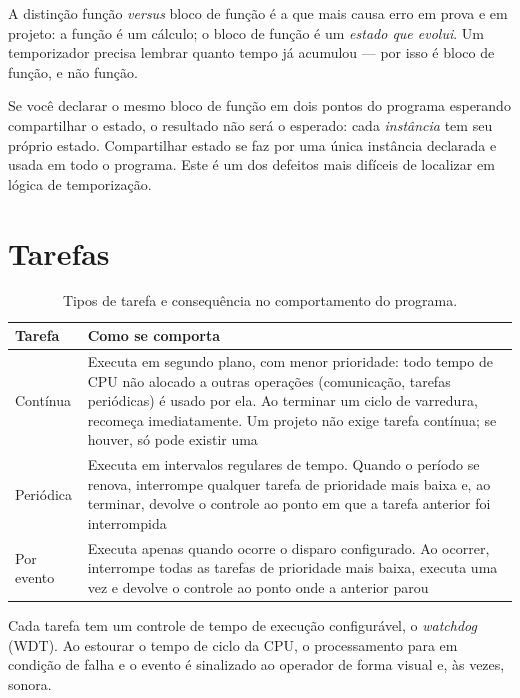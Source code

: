 A distinção função \emph{versus} bloco de função é a que mais causa erro em prova e em projeto: a
função é um cálculo; o bloco de função é um \emph{estado que evolui}. Um temporizador precisa
lembrar quanto tempo já acumulou --- por isso é bloco de função, e não função.

\begin{atencao}
Se você declarar o mesmo bloco de função em dois pontos do programa esperando compartilhar o estado,
o resultado não será o esperado: cada \emph{instância} tem seu próprio estado. Compartilhar estado se
faz por uma única instância declarada e usada em todo o programa. Este é um dos defeitos mais difíceis
de localizar em lógica de temporização.
\end{atencao}

\section{Tarefas}
\label{sec:tarefas}

\begin{table}[H]
  \centering
  \caption{Tipos de tarefa e consequência no comportamento do programa.}
  \label{tab:tipos-tarefa}
  \begin{tabular}{p{3.0cm} p{11.6cm}}
    \toprule
    Tarefa & Como se comporta \\
    \midrule
    Contínua
      & Executa em segundo plano, com menor prioridade: todo tempo de CPU não alocado a outras
        operações (comunicação, tarefas periódicas) é usado por ela. Ao terminar um ciclo de
        varredura, recomeça imediatamente. Um projeto não exige tarefa contínua; se houver, só pode
        existir uma \\
    Periódica
      & Executa em intervalos regulares de tempo. Quando o período se renova, interrompe qualquer
        tarefa de prioridade mais baixa e, ao terminar, devolve o controle ao ponto em que a tarefa
        anterior foi interrompida \\
    Por evento
      & Executa apenas quando ocorre o disparo configurado. Ao ocorrer, interrompe todas as tarefas
        de prioridade mais baixa, executa uma vez e devolve o controle ao ponto onde a anterior
        parou \\
    \bottomrule
  \end{tabular}
\end{table}

Cada tarefa tem um controle de tempo de execução configurável, o \emph{watchdog} (WDT). Ao estourar
o tempo de ciclo da CPU, o processamento para em condição de falha e o evento é sinalizado ao
operador de forma visual e, às vezes, sonora.

